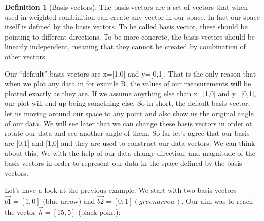 \documentclass[
]{book}
\theoremstyle{definition}
\newtheorem{definition}{Definition}[chapter]
\theoremstyle{definition}
\theoremstyle{definition}
\theoremstyle{remark}
\begin{document}
\begin{definition}[Basis vectors]
\protect\hypertarget{def:bvectors}{}{\label{def:bvectors} \iffalse (Basis vectors) \fi{} }
The basis vectors are a set of vectors that when used in weighted combinition can create any vector in our space. In fact our space itself is defined by the basis vectors. To be called basis vector, these should be pointing to different directions. To be more concrete, the basis vectors should be linearly independent, meaning that they cannot be created by combination of other vectors.

Our ``default'' basis vectors are x={[}1,0{]} and y={[}0,1{]}. That is the only reason that when we plot any data in for examle R, the values of our measurements will be plotted exactly as they are. If we assume anything else than x={[}1,0{]} and y={[}0,1{]}, our plot will end up being something else. So in short, the default basis vector, let us moving around our space to any point and also show us the original angle of our data. We will see later that we can change these basis vectors in order ot rotate our data and see another angle of them. So far let's agree that our basis are {[}0,1{]} and {[}1,0{]} and they are used to construct our data vectors. We can think about this, We with the help of our data change direction, and magnitude of the basis vectors in order to represent our data in the space defined by the basis vectors.
\end{definition}

Let's have a look at the previous example. We start with two basis vectors \(\vec{b1}=[1,0]\) (blue arrow) and \(\vec{b2}=[0,1] (green arrow)\). Our aim was to reach the vector \(\vec{h}=[15,5]\) (black point):
\end{document}

